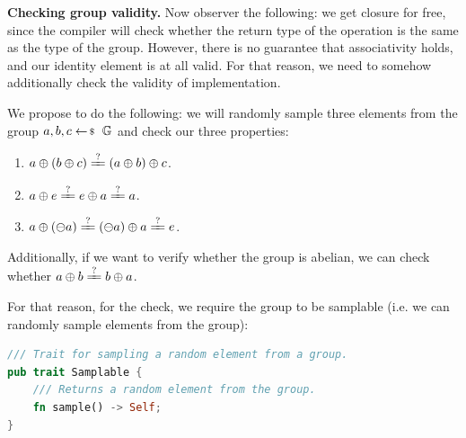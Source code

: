 \documentclass[../lecture-notes-148x210.tex]{subfiles}
\begin{document}
\textbf{Checking group validity.} Now observer the following: we get closure for free, since the compiler will check 
whether the return type of the operation is the same as the type of the group. However, there is no guarantee that 
associativity holds, and our identity element is at all valid. For that reason, we need to somehow additionally check 
the validity of implementation.

We propose to do the following: we will randomly sample three elements from the group 
$a,b,c \leftarrowS \mathbb{G}$ and check our three properties:
\begin{enumerate}
    \item $a \oplus (b \oplus c) \xlongequal{?} (a \oplus b) \oplus c$.
    \item $a \oplus e \xlongequal{?} e \oplus a \xlongequal{?} a $.
    \item $a \oplus (\ominus a) \xlongequal{?} (\ominus a) \oplus a \xlongequal{?} e$.
\end{enumerate}

Additionally, if we want to verify whether the group is abelian, we can check whether $a \oplus b \xlongequal{?} b \oplus a$. 

For that reason, for the check, we require the group to be samplable (i.e. we can randomly sample elements from the group):
\begin{lstlisting}[language=Rust]
/// Trait for sampling a random element from a group.
pub trait Samplable {
    /// Returns a random element from the group.
    fn sample() -> Self;
}
\end{lstlisting}
\end{document}
